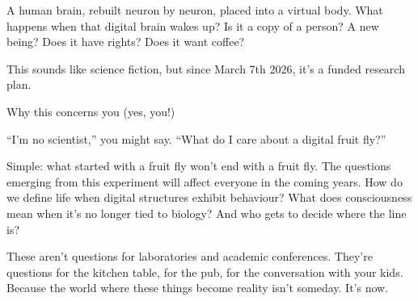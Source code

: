 \documentclass[9pt,a4paper]{extarticle}
\makeatletter
\newlength{\newsleading}
\renewcommand{\subsection}[1]{%
  \par\addpenalty{\@secpenalty}\addvspace{\newsleading}%
  \begingroup
    \sffamily\bfseries\fontsize{8}{\newsleading}\selectfont
    \interlinepenalty=10000
    \noindent\strut #1\strut\par
  \endgroup
  \nobreak\@afterindentfalse\@afterheading
}
\makeatother
\begin{document}
A human brain, rebuilt neuron by neuron, placed into a virtual body. What happens when that digital brain wakes up? Is it a copy of a person? A new being? Does it have rights? Does it want coffee?

This sounds like science fiction, but since March 7th 2026, it’s a funded research plan.

\subsection{Why this concerns you (yes, you!)}
“I’m no scientist,” you might say. “What do I care about a digital fruit fly?”

Simple: what started with a fruit fly won’t end with a fruit fly. The questions emerging from this experiment will affect everyone in the coming years. How do we define life when digital structures exhibit behaviour? What does consciousness mean when it’s no longer tied to biology? And who gets to decide where the line is?

These aren’t questions for laboratories and academic conferences. They’re questions for the kitchen table, for the pub, for the conversation with your kids. Because the world where these things become reality isn’t someday. It’s now.
\end{document}
